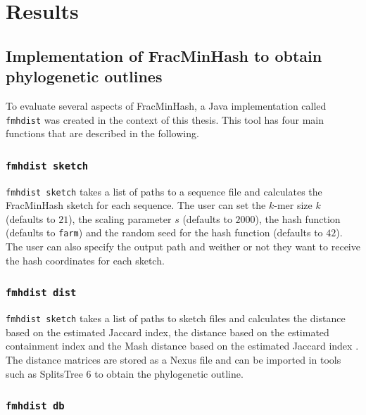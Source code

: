 
\chapter{Results}
  \label{sec:res}

\section{Implementation of FracMinHash to obtain phylogenetic outlines}
To evaluate several aspects of FracMinHash, a Java implementation called
\texttt{fmhdist} was created in the context of this thesis. This tool has four
main functions that are described in the following.

\subsection*{\texttt{fmhdist sketch}}

\texttt{fmhdist sketch} takes a list of paths to a sequence file and calculates
the FracMinHash sketch for each sequence. The user can set the $k$-mer size $k$
(defaults to $21$), the scaling parameter $s$ (defaults to $2000$), the hash
function (defaults to \texttt{farm}) and the random seed for the hash function
(defaults to $42$). The user can also specify the output path and weither or not
they want to receive the hash coordinates for each sketch.

\subsection*{\texttt{fmhdist dist}}

\texttt{fmhdist sketch} takes a list of paths to sketch files and calculates the
distance based on the estimated Jaccard index, the distance based on the
estimated containment index
\cite{heraDebiasingFracMinHashDeriving2023,irberLightweightCompositionalAnalysis2022}
and the Mash distance based on the estimated Jaccard index
\cite{ondovMashFastGenome2016}. The distance matrices are stored as a Nexus file
and can be imported in tools such as SplitsTree 6 to obtain the phylogenetic
outline. 

\subsection*{\texttt{fmhdist db}}

